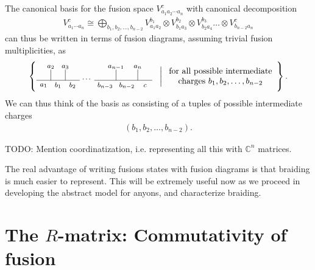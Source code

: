 \documentclass[a4paper,10pt,oneside]{book}
\theoremstyle{plain}
\theoremstyle{definition}
\theoremstyle{remark}
\begin{document}
{The canonical basis for the fusion space $V_{a_1a_2\cdots a_n}^c$ with canonical decomposition
\begin{align*}
  V_{a_1 \cdots a_n}^c \cong \bigoplus_{b_1,b_2,\ldots,b_{n-2}} V_{a_1a_2}^{b_1} \otimes V_{b_1 a_3}^{b_2} \otimes V_{b_2 a_4}^{b_3} \ldots \otimes V_{b_{n-2} a_n}^c
\end{align*}
can thus be written in terms of fusion diagrams, assuming trivial fusion multiplicities, as
\begin{align*}
  \left\{
  \begin{tikzpicture}[scale=0.3,font=\footnotesize,anchor=mid,baseline={([yshift=-.5ex]current bounding box.center)}]
    \node at (0, -0.6) {$a_1$};
    \node at (1, 2) {$a_2$};
    \node at (3, 2) {$a_3$};
    \node at (10, 2) {$a_{n-1}$};
    \node at (13, 2) {$a_n$};
%
    \draw (1, 0) to (1, 1.5);
    \draw (3, 0) to (3, 1.5);
%
    \draw (10, 0) to (10, 1.5);
    \draw (13, 0) to (13, 1.5);
%
    \draw (-1, 0) to (5, 0);
    \draw (7, 0) to (15, 0);
%
    \node at (2, -0.7) {$b_1$};
    \node at (4, -0.7) {$b_2$};
    \node at (6, 0.2) {$\cdots$};
%
    \node at (8.5, -0.7) {$b_{n-3}$};
    \node at (11.5, -0.7) {$b_{n-2}$};
    \node at (14, -0.7) {$c$};
  \end{tikzpicture}
  \;\;\;\bigg|\; \begin{array}{c}\text{for all possible intermediate} \\ \text{charges $b_1, b_2, \ldots, b_{n-2}$}\end{array}
  \right\}.
\end{align*}
We can thus think of the basis as consisting of a tuples of possible intermediate charges
\begin{align*}
  (b_1, b_2, \ldots, b_{n-2}).
\end{align*}

TODO: Mention coordinatization, i.e. representing all this with $\mathbb{C}^n$ matrices.

The real advantage of writing fusions states with fusion diagrams is that braiding is much easier to represent. This will be extremely useful now as we proceed in developing the abstract model for anyons, and characterize braiding.


\section{The $R$-matrix: Commutativity of fusion}

}
\end{document}

